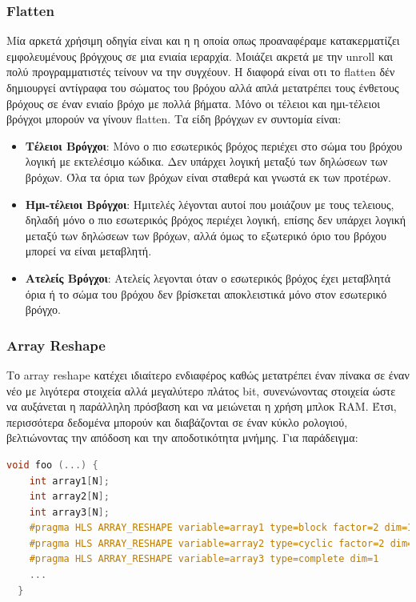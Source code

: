 \subsubsection{Flatten}
Μία αρκετά χρήσιμη οδηγία είναι και η  η οποία οπως προαναφέραμε κατακερματίζει εμφολευμένους βρόγχους σε μια ενιαία ιεραρχία. Μοιάζει ακρετά με την unroll και πολύ προγραμματιστές
τείνουν να την συγχέουν. Η διαφορά είναι οτι το flatten δέν δημιουργεί αντίγραφα του σώματος του βρόχου αλλά απλά μετατρέπει τους ένθετους βρόχους σε έναν ενιαίο βρόχο με πολλά βήματα.
Μόνο οι τέλειοι και ημι-τέλειοι βρόγχοι μπορούν να γίνουν flatten. Τα είδη βρόγχων εν συντομία είναι:
\begin{itemize}
  \item \textbf{Τέλειοι Βρόγχοι}: Μόνο ο πιο εσωτερικός βρόχος περιέχει στο σώμα του βρόχου λογική με εκτελέσιμο κώδικα. Δεν υπάρχει λογική μεταξύ των δηλώσεων των βρόχων. Όλα τα όρια των βρόχων είναι σταθερά και γνωστά εκ των προτέρων.
  \item \textbf{Ημι-τέλειοι Βρόγχοι}: Ημιτελές λέγονται αυτοί που μοιάζουν με τους τελειους, δηλαδή μόνο ο πιο εσωτερικός βρόχος περιέχει λογική, επίσης δεν υπάρχει λογική μεταξύ των δηλώσεων των βρόχων, αλλά όμως το εξωτερικό όριο του βρόχου μπορεί να είναι μεταβλητή.
  \item \textbf{Ατελείς Βρόγχοι}:  Ατελείς λεγονται όταν ο εσωτερικός βρόχος έχει μεταβλητά όρια ή το σώμα του βρόχου δεν βρίσκεται αποκλειστικά μόνο στον εσωτερικό βρόγχο.
\end{itemize}

\subsubsection{Array Reshape}
Το array reshape κατέχει ιδιαίτερο ενδιαφέρος καθώς μετατρέπει έναν πίνακα σε έναν νέο με λιγότερα στοιχεία αλλά μεγαλύτερο πλάτος bit,
συνενώνοντας στοιχεία ώστε να αυξάνεται η παράλληλη πρόσβαση και να μειώνεται η χρήση μπλοκ RAM.
Έτσι, περισσότερα δεδομένα μπορούν και διαβάζονται σε έναν κύκλο ρολογιού, βελτιώνοντας την απόδοση και την αποδοτικότητα μνήμης. Για παράδειγμα:

\begin{lstlisting}[language=C++, caption={Παράδειγμα Array Reshaping}]
  void foo (...) {
    int array1[N];
    int array2[N];
    int array3[N];
    #pragma HLS ARRAY_RESHAPE variable=array1 type=block factor=2 dim=1
    #pragma HLS ARRAY_RESHAPE variable=array2 type=cyclic factor=2 dim=1
    #pragma HLS ARRAY_RESHAPE variable=array3 type=complete dim=1
    ...
  }
\end{lstlisting}

